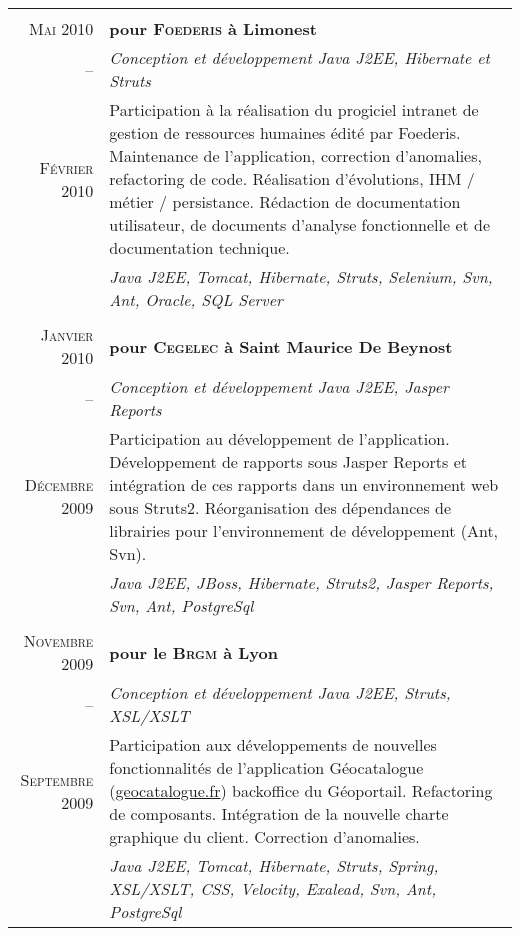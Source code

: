 \documentclass[a4paper,10pt]{article}
\begin{document}
\begin{supertabular}{r|p{11cm}}
   \\
  \textsc{Mai} 2010 & \textbf{pour \textsc{Foederis} à Limonest} \\
  -- & \emph{Conception et développement Java J2EE, Hibernate et Struts} \\
  \footnotesize{\textsc{Février 2010}} & \footnotesize{Participation à la réalisation du progiciel intranet de gestion de ressources humaines édité par Foederis. Maintenance de l’application, correction d’anomalies, refactoring de code. Réalisation d’évolutions, IHM / métier / persistance. Rédaction de documentation utilisateur, de documents d’analyse fonctionnelle et de documentation technique.} \\
  & \emph{Java J2EE, Tomcat, Hibernate, Struts, Selenium, Svn, Ant, Oracle, SQL Server} \\


   \\
  \textsc{Janvier} 2010 & \textbf{pour \textsc{Cegelec} à Saint Maurice De Beynost} \\
  -- & \emph{Conception et développement Java J2EE, Jasper Reports} \\
  \footnotesize{\textsc{Décembre 2009}}  & \footnotesize{Participation au développement de l’application. Développement de rapports sous Jasper Reports et intégration de ces rapports dans un environnement web sous Struts2. Réorganisation des dépendances de librairies pour l’environnement de développement (Ant, Svn).} \\
  & \emph{Java J2EE, JBoss, Hibernate, Struts2, Jasper Reports, Svn, Ant, PostgreSql} \\


   \\
  \textsc{Novembre} 2009 & \textbf{pour le \textsc{Brgm} à Lyon} \\
  -- & \emph{Conception et développement Java J2EE, Struts, XSL/XSLT} \\
  \footnotesize{\textsc{Septembre 2009}} & \footnotesize{Participation aux développements de nouvelles fonctionnalités de l’application Géocatalogue (\href{http://www.geocatalogue.fr}{geocatalogue.fr}) backoffice du Géoportail. Refactoring de composants. Intégration de la nouvelle charte graphique du client. Correction d’anomalies.} \\
  & \emph{Java J2EE, Tomcat, Hibernate, Struts, Spring, XSL/XSLT, CSS, Velocity, Exalead, Svn, Ant, PostgreSql} \\



\end{supertabular}
\end{document}
